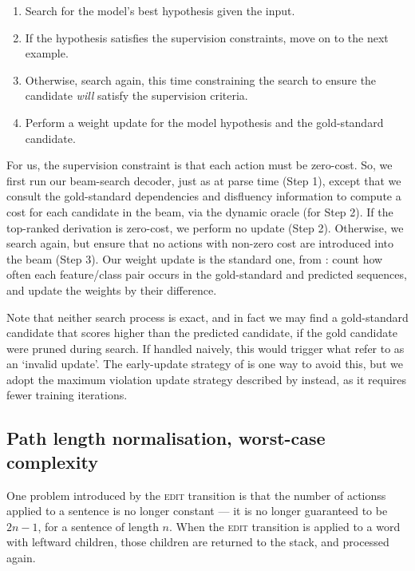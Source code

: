 \documentclass[11pt,letterpaper]{article}
\begin{document}
\begin{enumerate}
\item Search for the model's best hypothesis given the input.
\item If the hypothesis satisfies the supervision constraints, move on to the
      next example.
\item Otherwise, search again, this time constraining the search to ensure the
    candidate \emph{will} satisfy the supervision criteria.
\item Perform a weight update for the model hypothesis and the gold-standard
      candidate.
\end{enumerate}

For us, the supervision constraint is that each action must be zero-cost.  So,
we first run our beam-search decoder, just as at parse time (Step 1),
except that we consult the gold-standard dependencies and disfluency information
to compute a cost for each candidate in the beam, via the dynamic oracle (for Step 2).
If the top-ranked derivation is zero-cost, we perform no update (Step 2).
Otherwise, we search again, but
ensure that no actions with non-zero cost are introduced into the beam (Step 3).
Our weight update is the standard one, from \citet{collins:02}: count how often
each feature/class pair occurs in the gold-standard and predicted sequences,
and update the weights by their difference.

Note that neither search process is exact, and in fact we may find a gold-standard
candidate that scores higher than the predicted candidate, if the gold candidate
were pruned during search.  If handled naively, this would trigger what \citet{huang:12}
refer to as an `invalid update'.  The early-update strategy of \citet{collins:02}
is one way to avoid this, but we adopt the maximum violation update strategy
described by \citet{huang:12} instead, as it requires fewer training iterations.

\subsection{Path length normalisation, worst-case complexity}

One problem introduced by the \textsc{edit} transition is that the number of
actionss applied to a sentence is no longer constant --- it is no longer guaranteed
to be $2n-1$, for a sentence of length $n$. When the \textsc{edit} transition is
applied to a word with leftward children, those children are returned to the stack,
and processed again.
\end{document}
